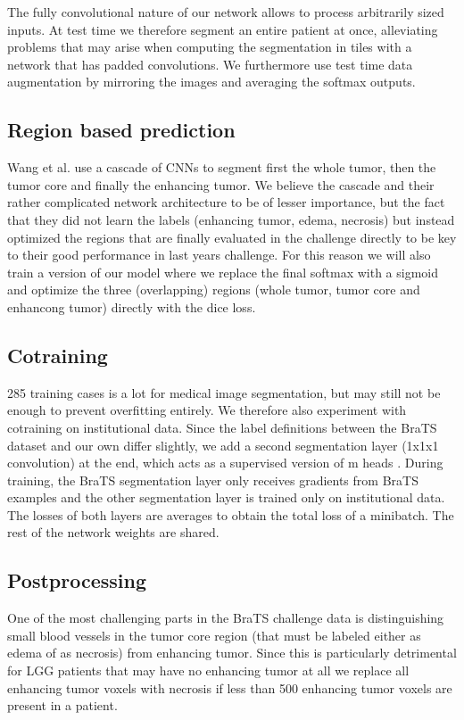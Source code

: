 \documentclass{templates/llncs} %
\begin{document}
  The fully convolutional nature of our network allows to process arbitrarily sized inputs. At test time we therefore segment an entire patient at once, alleviating problems that may arise when computing the segmentation in tiles with a network that has padded convolutions. We furthermore use test time data augmentation by mirroring the images and averaging the softmax outputs.
  
  \subsection{Region based prediction}
  Wang et al. \cite{wang2017automatic} use a cascade of CNNs to segment first the whole tumor, then the tumor core and finally the enhancing tumor. We believe the cascade and their rather complicated network architecture to be of lesser importance, but the fact that they did not learn the labels (enhancing tumor, edema, necrosis) but instead optimized the regions that are finally evaluated in the challenge directly to be key to their good performance in last years challenge. For this reason we will also train a version of our model where we replace the final softmax with a sigmoid and optimize the three (overlapping) regions (whole tumor, tumor core and enhancong tumor) directly with the dice loss.
  
  \subsection{Cotraining}
  285 training cases is a lot for medical image segmentation, but may still not be enough to prevent overfitting entirely. We therefore also experiment with cotraining on institutional data. Since the label definitions between the BraTS dataset and our own differ slightly, we add a second segmentation layer (1x1x1 convolution) at the end, which acts as a supervised version of m heads \cite{lee2015m}. During training, the BraTS segmentation layer only receives gradients from BraTS examples and the other segmentation layer is trained only on institutional data. The losses of both layers are averages to obtain the total loss of a minibatch. The rest of the network weights are shared.
  
  \subsection{Postprocessing}
  One of the most challenging parts in the BraTS challenge data is distinguishing small blood vessels in the tumor core region (that must be labeled either as edema of as necrosis) from enhancing tumor. Since this is particularly detrimental for LGG patients that may have no enhancing tumor at all we replace all enhancing tumor voxels with necrosis if less than 500 enhancing tumor voxels are present in a patient.
  
\end{document}
